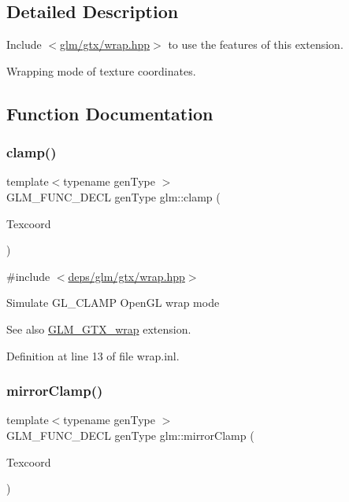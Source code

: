 \subsection{Detailed Description}
Include $<$\hyperlink{wrap_8hpp}{glm/gtx/wrap.\+hpp}$>$ to use the features of this extension.

Wrapping mode of texture coordinates. 

\subsection{Function Documentation}
\mbox{\label{group__gtx__wrap_ga6c0cc6bd1d67ea1008d2592e998bad33}} 
\subsubsection{\texorpdfstring{clamp()}{clamp()}}
{\footnotesize\ttfamily template$<$typename gen\+Type $>$ \\
G\+L\+M\+\_\+\+F\+U\+N\+C\+\_\+\+D\+E\+CL gen\+Type glm\+::clamp (\begin{DoxyParamCaption}\item[{gen\+Type const \&}]{Texcoord }\end{DoxyParamCaption})}



{\ttfamily \#include $<$\hyperlink{wrap_8hpp}{deps/glm/gtx/wrap.\+hpp}$>$}

Simulate G\+L\+\_\+\+C\+L\+A\+MP Open\+GL wrap mode \begin{DoxySeeAlso}{See also}
\hyperlink{group__gtx__wrap}{G\+L\+M\+\_\+\+G\+T\+X\+\_\+wrap} extension. 
\end{DoxySeeAlso}


Definition at line 13 of file wrap.\+inl.

\mbox{\label{group__gtx__wrap_gaa6856a0a048d2749252848da35e10c8b}} 
\subsubsection{\texorpdfstring{mirror\+Clamp()}{mirrorClamp()}}
{\footnotesize\ttfamily template$<$typename gen\+Type $>$ \\
G\+L\+M\+\_\+\+F\+U\+N\+C\+\_\+\+D\+E\+CL gen\+Type glm\+::mirror\+Clamp (\begin{DoxyParamCaption}\item[{gen\+Type const \&}]{Texcoord }\end{DoxyParamCaption})}



